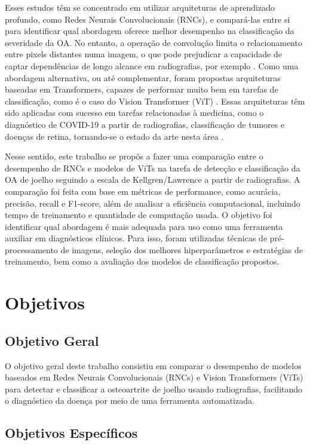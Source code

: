 Esses estudos têm se concentrado em utilizar arquiteturas de aprendizado profundo, como Redes Neurais Convolucionais (RNCs), e compará-las entre si para identificar qual abordagem oferece melhor desempenho na classificação da severidade da OA. No entanto, a operação de convolução limita o relacionamento entre pixels distantes numa imagem, o que pode prejudicar a capacidade de captar dependências de longo alcance em radiografias, por exemplo \cite{Shamshad2023}. Como uma abordagem alternativa, ou até complementar, foram propostas arquiteturas baseadas em Transformers, capazes de performar muito bem em tarefas de classificação, como é o caso do Vision Transformer (ViT) \cite{Dosovitskiy2021}. Essas arquiteturas têm sido aplicadas com sucesso em tarefas relacionadas à medicina, como o diagnóstico de COVID-19 a partir de radiografias, classificação de tumores e doenças de retina, tornando-se o estado da arte nesta área \cite{Shamshad2023}.

Nesse sentido, este trabalho se propôs a fazer uma comparação entre o desempenho de RNCs e modelos de ViTs na tarefa de detecção e classificação da OA de joelho seguindo a escala de Kellgren/Lawrence a partir de radiografias. A comparação foi feita com base em métricas de performance, como acurácia, precisão, recall e F1-score, além de analisar a eficiência computacional, incluindo tempo de treinamento e quantidade de computação usada. O objetivo foi identificar qual abordagem é mais adequada para uso como uma ferramenta auxiliar em diagnósticos clínicos. Para isso, foram utilizadas técnicas de pré-processamento de imagens, seleção dos melhores hiperparâmetros e estratégias de treinamento, bem como a avaliação dos modelos de classificação propostos.

\section{Objetivos}

\subsection{Objetivo Geral}

O objetivo geral deste trabalho consistiu em comparar o desempenho de modelos baseados em Redes Neurais Convolucionais (RNCs) e Vision Transformers (ViTs) para detectar e classificar a osteoartrite de joelho usando radiografias, facilitando o diagnóstico da doença por meio de uma ferramenta automatizada.

\subsection{Objetivos Específicos}

